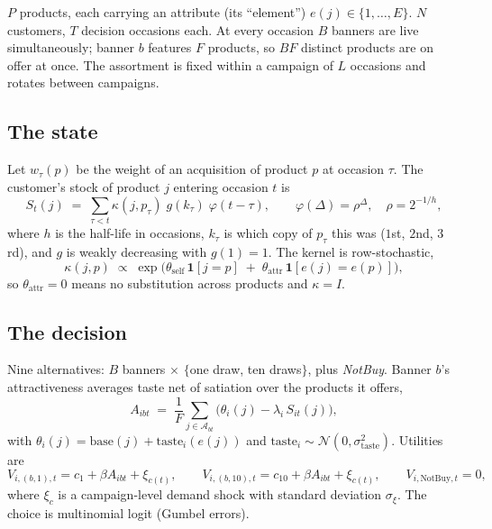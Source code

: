 \documentclass[11pt]{article}
\begin{document}
$P$ products, each carrying an attribute (its ``element'') $e(j) \in
\{1,\dots,E\}$. $N$ customers, $T$ decision occasions each. At every occasion
$B$ banners are live simultaneously; banner $b$ features $F$ products, so $BF$
distinct products are on offer at once. The assortment is fixed within a
campaign of $L$ occasions and rotates between campaigns.

\subsection{The state}

Let $w_\tau(p)$ be the weight of an acquisition of product $p$ at occasion
$\tau$. The customer's stock of product $j$ entering occasion $t$ is
\begin{equation}
S_t(j) \;=\; \sum_{\tau < t} \kappa(j, p_\tau)\; g(k_\tau)\; \varphi(t-\tau),
\qquad \varphi(\Delta) = \rho^{\Delta},\quad \rho = 2^{-1/h},
\label{eq:stock}
\end{equation}
where $h$ is the half-life in occasions, $k_\tau$ is which copy of $p_\tau$ this
was ($1$st, $2$nd, $3$rd), and $g$ is weakly decreasing with $g(1)=1$. The
kernel is row-stochastic,
\begin{equation}
\kappa(j,p) \;\propto\; \exp\big(\theta_{\text{self}}\,\mathbf{1}[j=p]
   \;+\; \theta_{\text{attr}}\,\mathbf{1}[e(j)=e(p)]\big),
\label{eq:kappa}
\end{equation}
so $\theta_{\text{attr}}=0$ means no substitution across products and
$\kappa = I$.

\subsection{The decision}

Nine alternatives: $B$ banners $\times$ $\{$one draw, ten draws$\}$, plus
\emph{NotBuy}. Banner $b$'s attractiveness averages taste net of satiation over
the products it offers,
\begin{equation}
A_{ib t} \;=\; \frac{1}{F}\sum_{j \in \mathcal{A}_{bt}}
   \big(\theta_i(j) - \lambda_i\, S_{it}(j)\big),
\end{equation}
with $\theta_i(j) = \text{base}(j) + \text{taste}_i(e(j))$ and
$\text{taste}_i \sim \mathcal{N}(0,\sigma_{\text{taste}}^2)$. Utilities are
\begin{equation}
V_{i,(b,1),t} = c_1 + \beta A_{ibt} + \xi_{c(t)}, \qquad
V_{i,(b,10),t} = c_{10} + \beta A_{ibt} + \xi_{c(t)}, \qquad
V_{i,\text{NotBuy},t} = 0,
\end{equation}
where $\xi_{c}$ is a campaign-level demand shock with standard deviation
$\sigma_{\xi}$. The choice is multinomial logit (Gumbel errors).
\end{document}
